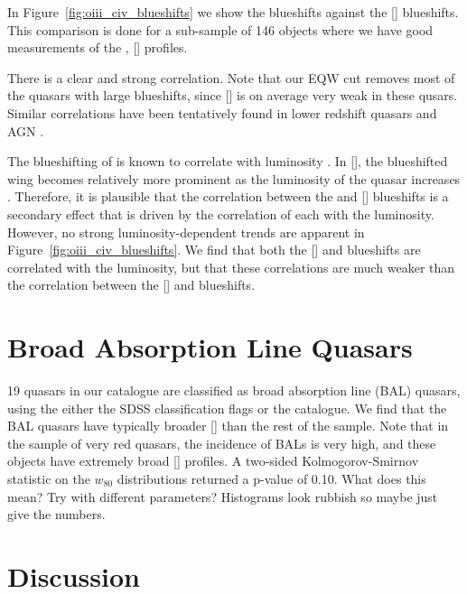 In Figure~\ref{fig:oiii_civ_blueshifts} we show the  blueshifts against the [] blueshifts.
This comparison is done for a sub-sample of 146 objects where we have good measurements of the , [] profiles. 

There is a clear and strong correlation. 
Note that our EQW cut removes most of the quasars with large  blueshifts, since [] is on average very weak in these qusars. 
Similar correlations have been tentatively found in lower redshift quasars and \ac{AGN} \citep{zamanov02}. 

The blueshifting of  is known to correlate with luminosity \citep{richards11}.
In [], the blueshifted wing becomes relatively more prominent as the luminosity of the quasar increases \citep{shen14}. 
Therefore, it is plausible that the correlation between the  and [] blueshifts is a secondary effect that is driven by the correlation of each with the luminosity. 
However, no strong luminosity-dependent trends are apparent in Figure~\ref{fig:oiii_civ_blueshifts}. 
We find that both the [] and  blueshifts are correlated with the luminosity, but that these correlations are much weaker than the correlation between the [] and  blueshifts. 




\section{Broad Absorption Line Quasars}

19 quasars in our catalogue are classified as broad absorption line (BAL) quasars, using the either the SDSS classification flags or the \citet{allen11} catalogue. 
We find that the BAL quasars have typically broader [] than the rest of the sample. 
Note that in the \citet{zakamska16} sample of very red quasars, the incidence of BALs is very high, and these objects have extremely broad [] profiles. 
A two-sided Kolmogorov-Smirnov statistic on the $w_{80}$ distributions returned a p-value of 0.10. 
What does this mean?
Try with different parameters?
Histograms look rubbish so maybe just give the numbers. 

\section{Discussion}

